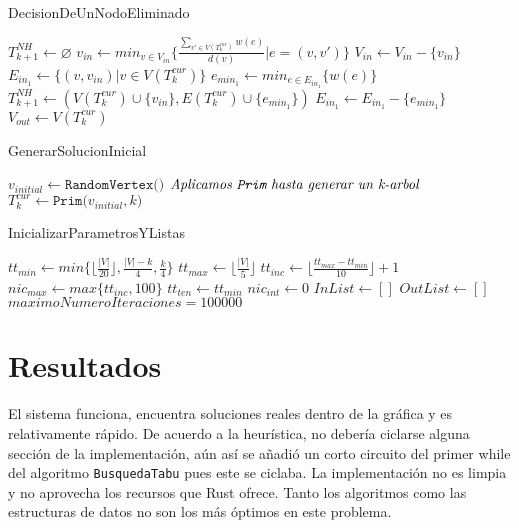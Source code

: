 \documentclass[letter,10pt]{article}
\theoremstyle{definition}
\begin{document}
 \begin{algorithm}[H]
    \caption{DecisionDeUnNodoEliminado}\label{alg:two}
    $ T^{NH}_{k+1} \gets \varnothing$\;
    $v_{in} \gets 
                min_{v\in V_{in}}
                    \Bigg \{ \frac{\sum_{v'\in V(T^{cur}_k )} w(e)}{d(v)} \Big | e = (v,v')
                    \Bigg \}$\;
            $V_{in} \gets V_{in}-\{v_{in}\}$\;
            $E_{in_1} \gets \{ (v,v_{in}) | v\in V(T^{cur}_k) \}$\;
            $e_{min_1} \gets min_{e\in E_{in_1}}\{ w(e) \}$\;
            $T^{NH}_{k+1} \gets (V(T^{cur}_k) \cup \{v_{in} \}, E(T^{cur}_k) \cup \{e_{min_1} \} ) $\;
            $E_{in_1} \gets E_{in_1}-\{e_{min_1}\}$\;
            $V_{out} \gets V(T^{cur}_k)$\;
            \;
\end{algorithm}

 
\begin{algorithm}[H]
    \caption{GenerarSolucionInicial}\label{alg:two}
        $v_{initial} \gets \texttt{RandomVertex()}$\;
        $\textit{Aplicamos \texttt{Prim} hasta generar un k-arbol }$\;
        $T^{cur}_k \gets \texttt{Prim($v_{initial}, k)$}$\;
        \;
\end{algorithm}


\begin{algorithm}[H]
\caption{InicializarParametrosYListas}\label{alg:two}
    
    $tt_{min} \gets min \Big \{ \Big \lfloor\frac{|V|}{20} \Big \rfloor, \frac{|V|-k}{4}, \frac{k}{4} \Big \}$\;
    $tt_{max} \gets \Big \lfloor\frac{|V|}{5} \Big \rfloor$\;
    $tt_{inc} \gets \Big \lfloor\frac{tt_{max}-tt_{min}}{10}\Big \rfloor +1$\;
    $nic_{max} \gets max\{ tt_{inc} , 100\}$\;
    $tt_{ten} \gets tt_{min}$\;
    $nic_{int} \gets 0$\;
    $InList \gets []$\;
    $OutList \gets []$\;
    $maximoNumeroIteraciones = 100000$\;
\end{algorithm}

\section{Resultados}
El sistema funciona, encuentra soluciones reales dentro de la gráfica y es relativamente rápido. De acuerdo a la heurística, no debería ciclarse alguna sección de la implementación, aún así se añadió un corto circuito del primer while del algoritmo \texttt{BusquedaTabu} pues este se ciclaba. La implementación no es limpia y no aprovecha los recursos que Rust ofrece. Tanto los algoritmos como las estructuras de datos no son los más óptimos en este problema.
\end{document}
